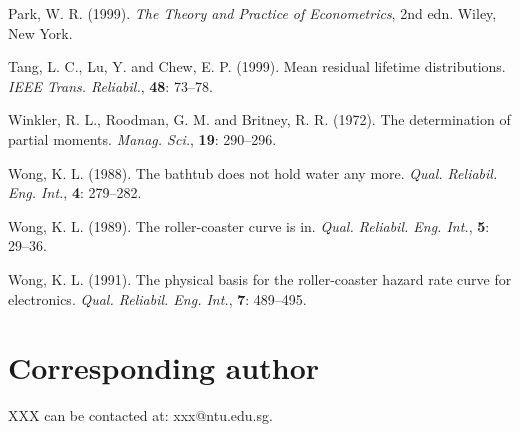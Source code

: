 \documentclass{IJCS_template}
\begin{document}
\begin{thebibliography}
Park, W. R. (1999). {\it The Theory and Practice of
Econometrics}, 2nd edn. Wiley, New York.

Tang, L. C., Lu, Y. and Chew, E. P. (1999). Mean residual lifetime
distributions. {\it IEEE Trans. Reliabil.}, {\bf 48}: 73--78.

Winkler, R. L., Roodman, G. M. and Britney, R. R. (1972). The
determination of partial moments. {\it Manag. Sci.},
{\bf 19}: 290--296.

Wong, K. L. (1988). The bathtub does not hold water any more.
{\it Qual. Reliabil. Eng. Int.}, {\bf 4}: 279--282.

Wong, K. L. (1989). The roller-coaster curve is in.
{\it Qual. Reliabil. Eng. Int.}, {\bf 5}: 29--36.

Wong, K. L. (1991). The physical basis for the roller-coaster
hazard rate curve for electronics. {\it Qual. Reliabil.
Eng. Int.}, {\bf 7}: 489--495.
\end{thebibliography}


\section*{Corresponding author}
XXX can be contacted at: xxx@ntu.edu.sg.
\end{document}
